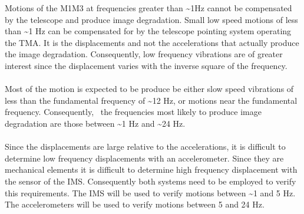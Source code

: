 \documentclass[SE,lsstdraft,STR,toc]{lsstdoc}
\begin{document}
Motions of the M1M3 at frequencies greater than \textasciitilde{}1Hz
cannot be compensated by the telescope and produce image degradation.
Small low speed motions of less than \textasciitilde{}1 Hz can be
compensated for by the telescope pointing system operating the TMA. It
is the displacements and not the accelerations that actually produce the
image degradation. Consequently, low frequency vibrations are of greater
interest since the displacement varies with the inverse square of the
frequency.\\
\hspace*{0.333em}\\
Most of the motion is expected to be produce be either slow speed
vibrations of less than the fundamental frequency of \textasciitilde{}12
Hz, or motions near the fundamental frequency. Consequently, ~the
frequencies most likely to produce image degradation are those between
\textasciitilde{}1 Hz and \textasciitilde{}24 Hz. ~\\
\hspace*{0.333em}\\
Since the displacements are large relative to the accelerations, it is
difficult to determine low frequency displacements with an
accelerometer. Since they are mechanical elements it is difficult to
determine high frequency displacement with the sensor of the IMS.
Consequently both systems need to be employed to verify this
requirements. The IMS will be used to verify motions between
\textasciitilde{}1 and 5 Hz. The accelerometers will be used to verify
motions between 5 and 24 Hz.
\end{document}
